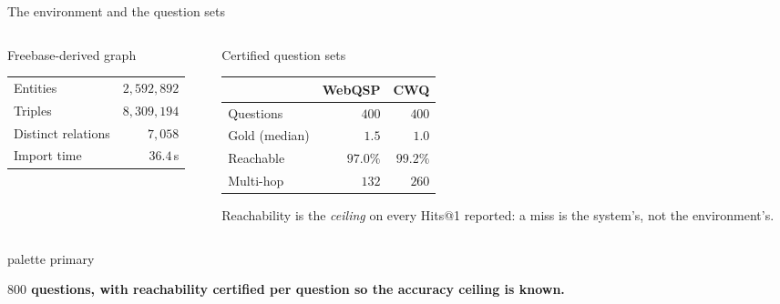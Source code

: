 \documentclass[aspectratio=169,12pt]{beamer}
\newcommand{\takeaway}[1]{%
  \vspace{1.5mm}%
  \begin{beamercolorbox}[wd=\dimexpr\textwidth-4.4mm\relax,sep=2.2mm,
    rounded=true]{palette primary}%
    \color{agrdark}\small\raggedright\textbf{#1}%
  \end{beamercolorbox}}
\begin{document}
\begin{frame}{The environment and the question sets}
  \begin{columns}[T]
    \begin{column}{0.45\textwidth}
      \begin{block}{Freebase-derived graph}
        \small
        \begin{tabular}{@{}lr@{}}
          Entities        & $2{,}592{,}892$ \\
          Triples         & $8{,}309{,}194$ \\
          Distinct relations & $7{,}058$ \\
          Import time     & $36.4$\,s \\
        \end{tabular}
      \end{block}
    \end{column}
    \begin{column}{0.5\textwidth}
      \begin{block}{Certified question sets}
        \small
        \begin{tabular}{@{}lrr@{}}
          \toprule
                       & \textbf{WebQSP} & \textbf{CWQ} \\
          \midrule
          Questions      & $400$ & $400$ \\
          Gold (median)  & $1.5$ & $1.0$ \\
          Reachable      & $97.0\%$ & $99.2\%$ \\
          Multi-hop      & $132$ & $260$ \\
          \bottomrule
        \end{tabular}
      \end{block}
      {\small Reachability is the \emph{ceiling} on every Hits@1 reported: a
      miss is the system's, not the environment's.}
    \end{column}
  \end{columns}
  \takeaway{$800$ questions, with reachability certified per question so the
    accuracy ceiling is known.}
\end{frame}
\end{document}
